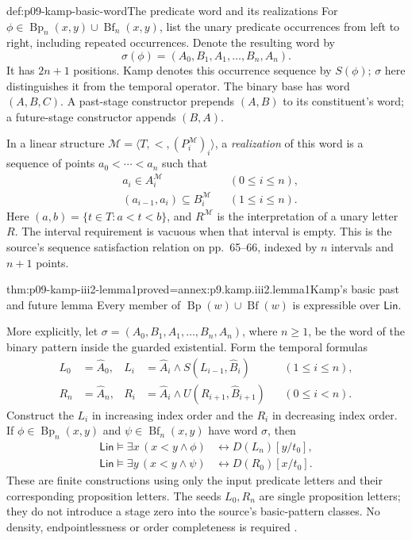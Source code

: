 \begin{hbdefinition}{def:p09-kamp-basic-word}{The predicate word and its realizations}
For \(\phi\in\operatorname{Bp}_n(x,y)\cup
\operatorname{Bf}_n(x,y)\), list the unary predicate occurrences from
left to right, including repeated occurrences.  Denote the resulting word by
\[
 \sigma(\phi)=(A_0,B_1,A_1,\ldots,B_n,A_n).
\]
It has \(2n+1\) positions.  Kamp denotes this occurrence sequence by
\(S(\phi)\); \(\sigma\) here distinguishes it from the temporal
operator.  The binary base has word \((A,B,C)\).  A past-stage
constructor prepends \((A,B)\) to its constituent's word; a future-stage
constructor appends \((B,A)\).

In a linear structure \(\mathcal M=\langle T,<,(P_i^{\mathcal M})_i\rangle\),
a \emph{realization} of this word is a sequence of points
\(a_0<\cdots<a_n\) such that
\[
\begin{aligned}
 &a_i\in A_i^{\mathcal M} &&(0\leq i\leq n),\\
 &(a_{i-1},a_i)\subseteq B_i^{\mathcal M} &&(1\leq i\leq n).
\end{aligned}
\]
Here \((a,b)=\{t\in T:a<t<b\}\), and \(R^{\mathcal M}\) is the
interpretation of a unary letter \(R\).  The interval requirement is
vacuous when that interval is empty.  This is the source's sequence
satisfaction relation on pp.~65--66, indexed by \(n\) intervals and
\(n+1\) points.
\end{hbdefinition}

\begin{hblemma}{thm:p09-kamp-iii2-lemma1}{proved=annex:p9.kamp.iii2.lemma1}{Kamp's basic past and future lemma}
Every member of \(\operatorname{Bp}(w)\cup\operatorname{Bf}(w)\)
is expressible over \(\mathsf{Lin}\).

More explicitly, let
\(\sigma=(A_0,B_1,A_1,\ldots,B_n,A_n)\), where \(n\geq1\), be the
word of the binary pattern inside the guarded existential.  Form the
temporal formulas
\[
\begin{aligned}
 L_0&=\widehat A_0,&
 L_i&=\widehat A_i\land S(L_{i-1},\widehat B_i)
            &&(1\leq i\leq n),\\
 R_n&=\widehat A_n,&
 R_i&=\widehat A_i\land U(R_{i+1},\widehat B_{i+1})
            &&(0\leq i<n).
\end{aligned}
\]
Construct the \(L_i\) in increasing index order and the \(R_i\) in
decreasing index order.  If \(\phi\in\operatorname{Bp}_n(x,y)\)
and \(\psi\in\operatorname{Bf}_n(x,y)\) have word \(\sigma\), then
\[
\begin{aligned}
 \mathsf{Lin}\models
  \exists x\,(x<y\land\phi)
       &\longleftrightarrow D(L_n)[y/t_0],\\
 \mathsf{Lin}\models
  \exists y\,(x<y\land\psi)
       &\longleftrightarrow D(R_0)[x/t_0].
\end{aligned}
\]
These are finite constructions using only the input predicate letters and
their corresponding proposition letters.  The seeds \(L_0,R_n\) are
single proposition letters; they do not introduce a stage zero into the
source's basic-pattern classes.  No density, endpointlessness or order
completeness is required \cite[ch.~III, lemma~1, pp.~69--70]{Kamp1968}.
\end{hblemma}

